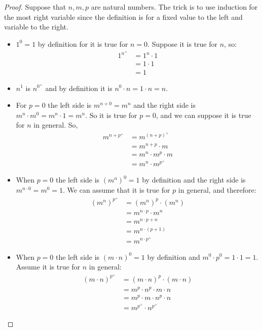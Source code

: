\documentclass{tufte-handout}
\begin{document}
\begin{proof}
	Suppose that $n, m, p$ are natural numbers. The trick is to use induction for the most right variable since the definition is for a fixed value to the left and variable to the right.

	\begin{itemize}
		\item $1^0 = 1$ by definition for it is true for $n = 0$. Suppose it is true for $n$, so:
		\begin{align*}
			1^{n^+} &= 1^n \cdot 1\\
			&= 1 \cdot 1\\
			&= 1
		\end{align*}

		\item $n^1$ is $n^{0^+}$ and by definition it is $n^0 \cdot n = 1 \cdot n = n$.
		\item For $p = 0$ the left side is $m^{n + 0} = m^n$ and the right side is $m^n \cdot m^0 = m^n \cdot 1 = m^n$. So it is true for $p = 0$, and we can suppose it is true for $n$ in general. So,
		\begin{align*}
			m^{n + p^+} &= m^{(n+p)^+}\\
			&= m^{n + p} \cdot m\\
			&= m^n \cdot m^p \cdot m\\
			&= m^n \cdot m^{p^+}
		\end{align*}
		
		\item When $p = 0$ the left side is $(m^n)^0 = 1$ by definition and the right side is $m^{n \cdot 0} = m^0 = 1$. We can assume that it is true for $p$ in general, and therefore:
		\begin{align*}
			(m^n)^{p^+} &= (m^n)^p \cdot (m^n)\\
			&= m^{n \cdot p} \cdot m^n\\
			&= m^{n \cdot p + n}\\
			&= m^{n \cdot (p +1)}\\
			&= m^{n \cdot p^+}
		\end{align*}

		\item When $p = 0$ the left side is $(m \cdot n)^0 = 1$ by definition and $m^0 \cdot p^0 = 1\cdot 1 = 1$. Assume it is true for $n$ in general:
		\begin{align*}
			(m \cdot n)^{p^+} &= (m \cdot n)^p \cdot (m \cdot n)\\
			&= m^p \cdot n^p \cdot m \cdot n\\
			&= m^p \cdot m \cdot n^p \cdot n\\
			&= m^{p^+} \cdot n^{p^+}
		\end{align*}
	\end{itemize}
\end{proof}
\end{document}
